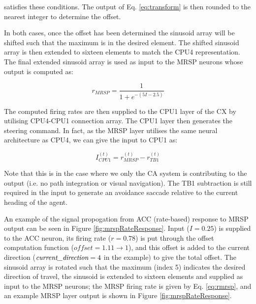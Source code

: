 \documentclass[a4paper,11pt,twoside,openright]{article}
\begin{document}
satisfies these conditions. The output of Eq. \ref{eq:transform} is
then rounded to the nearest integer to determine the offset.  \newline\par

In both cases, once the offset has been determined the sinusoid array
will be shifted such that the maximum is in the desired element. The
shifted sinusoid array is then extended to sixteen elements to match
the CPU4 representation. The final extended sinusoid array is used as
input to the MRSP neurons whose output is computed as:

\begin{equation}
  \label{eq:rmrsp}
  r_{MRSP} = \frac{1}{1 + e^{-(5I - 2.5)}}
\end{equation}

The computed firing rates are then supplied to the CPU1 layer of the
CX by utilising CPU4-CPU1 connection array. The CPU1 layer then
generates the steering command. In fact, as the MRSP layer utilises
the same neural architecture as CPU4, we can give the input to CPU1
as:

\begin{equation}
I_{CPU1}^{(t)} = r_{MRSP}^{(t)} - r_{TB1}^{(t)}
\end{equation}

Note that this is in the case where we only the CA system is
contributing to the output (i.e. no path integration or visual
navigation). The TB1 subtraction is still required in the input to
generate an avoidance saccade relative to the current heading of the
agent.
\newline\par

An example of the signal propogation from ACC (rate-based) response to
MRSP output can be seen in Figure \ref{fig:mrspRateResponse}. Input
($I=0.25$) is supplied to the ACC neuron, its firing rate ($r=0.78$)
is put through the offset computation function ($\textit{offset} =
1.11 \rightarrow 1$), and this offset is added to the current
direction ($\textit{current\textunderscore direction} = 4$ in the
example) to give the total offset. The sinusoid array is rotated such
that the maximum (index 5) indicates the desired direction of travel,
the sinusoid is extended to sixteen elements and supplied as input to
the MRSP neurons; the MRSP firing rate is given by Eq. \ref{eq:rmrsp},
and an example MRSP layer output is shown in Figure
\ref{fig:mrspRateResponse}.
\end{document}
